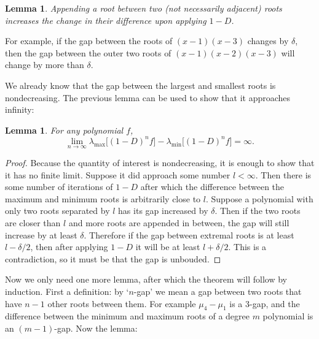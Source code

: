 \documentclass[11pt]{article}
\newtheorem{lemma}[theorem]{Lemma}
\begin{document}
\begin{lemma}
	Appending a root between two (not necessarily adjacent) roots increases the change in their difference upon applying $1-D$.
\end{lemma}
For example, if the gap between the roots of $(x-1)(x-3)$ changes by $\delta$, then the gap between the outer two roots of $(x-1)(x-2)(x-3)$ will change by more than $\delta$.

We already know that the gap between the largest and smallest roots is nondecreasing. The previous lemma can be used to show that it approaches infinity:

\begin{lemma}
\label{lem:maxgapinf}
	For any polynomial $f$,
	 \[ \lim_{n\to\infty} \lambda_{\max}\big[(1-D)^n f\big]-\lambda_{\min}\big[(1-D)^n f\big] = \infty. \]
\end{lemma}
\begin{proof}
	Because the quantity of interest is nondecreasing, it is enough to show that it has no finite limit. Suppose it did approach some number $l < \infty$. Then there is some number of iterations of $1-D$ after which the difference between the maximum and minimum roots is arbitrarily close to $l$. Suppose a polynomial with only two roots separated by $l$ has its gap increased by $\delta$. Then if the two roots are closer than $l$ and more roots are appended in between, the gap will still increase by at least $\delta$. Therefore if the gap between extremal roots is at least $l - \delta/2$, then after applying $1-D$ it will be at least $l + \delta/2$. This is a contradiction, so it must be that the gap is unbouded.
\end{proof}

Now we only need one more lemma, after which the theorem will follow by induction. First a definition: by `$n$-gap' we mean a gap between two roots that have $n-1$ other roots between them. For example $\mu_4-\mu_1$ is a 3-gap, and the difference between the minimum and maximum roots of a degree $m$ polynomial is an $(m-1)$-gap. Now the lemma:
\end{document}
